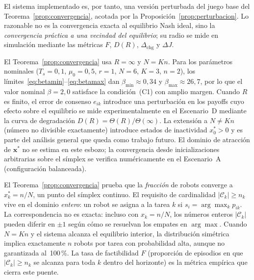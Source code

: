 El sistema implementado es, por tanto, una versión perturbada del juego base del
Teorema~\ref{prop:convergencia}, acotada por la Proposición~\ref{prop:perturbacion}. Lo
razonable no es la convergencia exacta al equilibrio Nash ideal, sino la
\emph{convergencia práctica a una vecindad del equilibrio}; su radio se mide en
simulación mediante las métricas $F$, $D(R)$, $\Delta_{\mathrm{chg}}$ y $\Delta J$.

\begin{observacion}
El Teorema~\ref{prop:convergencia} usa $R = \infty$ y $N = Kn$.
Para los parámetros nominales ($T_s\!=\!0{,}1$, $\mu_0\!=\!0{,}5$, $r\!=\!1$,
$N\!=\!6$, $K\!=\!3$, $n\!=\!2$), los límites~\eqref{eq:betamin}--\eqref{eq:betamax}
dan $\beta_{\min} \approx 0{,}34$ y $\beta_{\max} \approx 26{,}7$, por lo que el
valor nominal $\beta = 2{,}0$ satisface la condición~(C1) con amplio margen.
Cuando $R$ es finito, el error de consenso $e_{ik}$ introduce una perturbación
en los payoffs cuyo efecto sobre el equilibrio se mide experimentalmente en el
Escenario~D mediante la curva de degradación $D(R) = \Theta(R)/\Theta(\infty)$.
La extensión a $N \neq Kn$ (número no divisible exactamente) introduce estados
de inactividad $x_0^* > 0$ y es parte del análisis general que queda como
trabajo futuro. El dominio de atracción de $\mathbf{x}^*$ no se estima en este
esbozo; la convergencia desde inicializaciones arbitrarias sobre el símplex se
verifica numéricamente en el Escenario~A (configuración balanceada).
\end{observacion}

\begin{observacion}
\label{obs:fracciones_enteras}
El Teorema~\ref{prop:convergencia} prueba que la \emph{fracción} de robots
converge a $x_k^* = n/N$, un punto del símplex continuo. El requisito de
cardinalidad $|\mathcal{C}_k| \geq n_k$ vive en el dominio \emph{entero}: un robot
se asigna a la tarea $k$ si $s_i = \arg\max_k p_{ik}$. La correspondencia no es
exacta: incluso con $x_k = n/N$, los números enteros $|\mathcal{C}_k|$ pueden
diferir en $\pm 1$ según cómo se resuelvan los empates en $\arg\max$.
Cuando $N = Kn$ y el sistema alcanza el equilibrio interior, la
distribución simétrica implica exactamente $n$ robots por tarea con probabilidad
alta, aunque no garantizada al~100\,\%. La tasa de factibilidad $F$ (proporción de
episodios en que $|\mathcal{C}_k| \geq n_k$ se alcanza para toda $k$ dentro del
horizonte) es la métrica empírica que cierra este puente.
\end{observacion}

